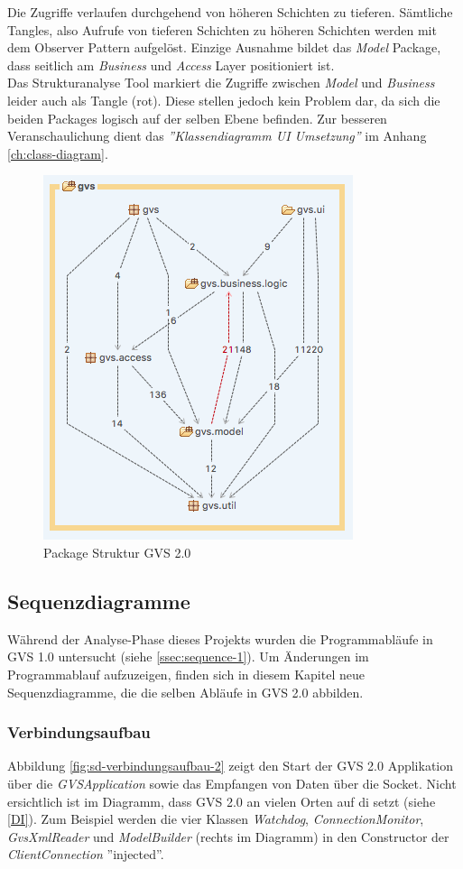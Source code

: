 \documentclass[11pt,a4paper,english,oneside]{book}
\numberwithin{equation}{chapter}
\begin{document}
	\noindent
	Die Zugriffe verlaufen durchgehend von höheren Schichten zu tieferen. Sämtliche Tangles, also Aufrufe von tieferen Schichten zu höheren Schichten werden mit dem Observer Pattern aufgelöst. Einzige Ausnahme bildet das \textit{Model} Package, dass seitlich am \textit{Business} und \textit{Access} Layer positioniert ist. \\
	\noindent
	Das Strukturanalyse Tool markiert die Zugriffe zwischen \textit{Model} und \textit{Business} leider auch als Tangle (rot). Diese stellen jedoch kein Problem dar, da sich die beiden Packages logisch auf der selben Ebene befinden. Zur besseren Veranschaulichung dient das \textit{''Klassendiagramm UI Umsetzung''} im Anhang \ref{ch:class-diagram}.
	
	\begin{figure}[h!]
		\centering
		\includegraphics[width=0.4\linewidth]{assets/images/structure-gvs2}
		\caption{Package Struktur GVS 2.0}
		\label{fig:structure-gvs2}
	\end{figure}
	
	
	\subsection{Sequenzdiagramme}
	Während der Analyse-Phase dieses Projekts wurden die Programmabläufe in GVS 1.0 untersucht (siehe \ref{ssec:sequence-1}). Um Änderungen im Programmablauf aufzuzeigen, finden sich in diesem Kapitel neue Sequenzdiagramme, die die selben Abläufe in GVS 2.0 abbilden. 
	
	\subsubsection{Verbindungsaufbau}
	Abbildung \ref{fig:sd-verbindungsaufbau-2} zeigt den Start der GVS 2.0 Applikation über die \textit{GVSApplication} sowie das Empfangen von Daten über die Socket. Nicht ersichtlich ist im Diagramm, dass GVS 2.0 an vielen Orten auf \gls{di} setzt (siehe \ref{DI}). Zum Beispiel werden die vier Klassen \textit{Watchdog},  \textit{ConnectionMonitor},  \textit{GvsXmlReader} und  \textit{ModelBuilder} (rechts im Diagramm) in den Constructor der  \textit{ClientConnection} ''injected''.
	
\end{document}
